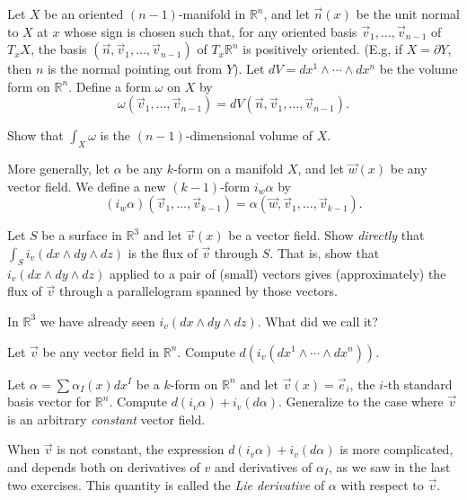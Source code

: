 \documentclass[12pt]{amsbook}
\newcommand{\R}{{\mathbb R}}
\theoremstyle{definition}
\begin{document}
Let $X$ be an oriented $(n-1)$-manifold in $\R^n$, and let $\vec n(x)$
be the unit normal to $X$ at $x$ whose sign is chosen such that, for any
oriented basis $\vec v_1,\ldots,\vec v_{n-1}$ of $T_xX$, the basis  
$(\vec n, \vec v_1, \ldots, \vec v_{n-1})$ of $T_x\R^n$ is positively oriented. 
(E.g, if $X = \partial Y$, then $n$ is the normal pointing out from $Y$). 
Let $dV = dx^1\wedge \cdots \wedge dx^n$ be the volume form on $\R^n$. Define
a form $\omega$ on $X$ by 
$$\omega(\vec v_1,\ldots,\vec v_{n-1}) = 
dV(\vec n, \vec v_1,\ldots,\vec v_{n-1}).$$

\smallskip

 Show that $\int_X \omega$ is the $(n-1)$-dimensional
volume of $X$. 

\smallskip

More generally, let $\alpha$ be any $k$-form on a manifold $X$, and let
$\vec w(x)$ be any vector field. We define a new $(k-1)$-form $i_w\alpha$
by 
$$ (i_w\alpha)(\vec v_1,\ldots,\vec v_{k-1})=\alpha(\vec w, \vec v_1,
\ldots,\vec v_{k-1}).$$

\smallskip

 Let $S$ be a surface in $\R^3$ and let $\vec v(x)$ be
a vector field. Show {\em directly} that $\int_S i_v(dx\wedge dy\wedge dz)$
is the flux of $\vec v$ through $S$. That is, show that 
$i_v(dx \wedge dy \wedge dz)$ applied to a pair of (small) vectors gives
(approximately) the flux of $\vec v$ through a parallelogram spanned by those
vectors. 

\smallskip

 In $\R^3$ we have already seen $i_v(dx \wedge dy
\wedge dz)$. What did we call it? 

\smallskip

 Let $\vec v$ be any vector field in $\R^n$.
Compute $d(i_v(dx^1\wedge \cdots \wedge dx^n))$. 

\smallskip

 Let $\alpha = \sum \alpha_I(x) dx^I$ be a 
$k$-form on $\R^n$ and let 
$\vec v(x)=\vec e_i$, the $i$-th standard basis vector for $\R^n$. 
Compute $d(i_v \alpha) + i_v(d\alpha)$. Generalize to the case where $\vec v$
is an arbitrary {\em constant} vector field. 

\smallskip

When $\vec v$ is not constant,
the expression $d(i_v \alpha) + i_v(d\alpha)$ is more complicated, and 
depends both on derivatives of $v$ and derivatives of $\alpha_I$, as we 
saw in the last two exercises. This quantity 
is called the {\em Lie derivative} of $\alpha$ with respect to $\vec v$.
\end{document}

